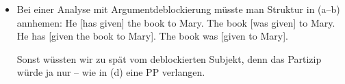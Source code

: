 
\begin{itemize}
\item Bei einer Analyse mit Argumentdeblockierung müsste man Struktur in (a--b) annhemen:
\eal
\ex He [has given] the book to Mary.
\ex The book [was given] to Mary.
\ex He has [given the book to Mary].
\ex The book was [given to Mary].
\zl

Sonst wüssten wir zu spät vom deblockierten Subjekt, denn das Partizip würde ja nur -- wie in
(d) eine PP verlangen.


\end{itemize}












